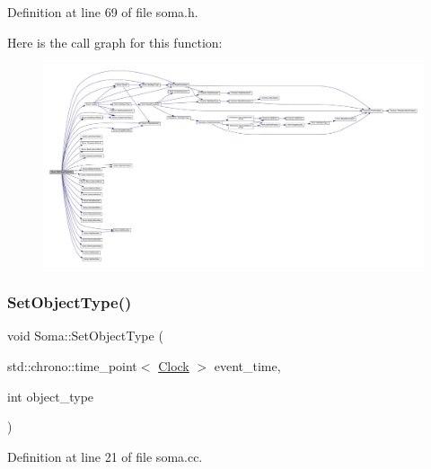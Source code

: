 Definition at line 69 of file soma.\+h.

Here is the call graph for this function\+:
\nopagebreak
\begin{figure}[H]
\begin{center}
\leavevmode
\includegraphics[width=350pt]{class_soma_ae2876b37909f37e8922ce364eb06491f_cgraph}
\end{center}
\end{figure}
\mbox{\label{class_soma_a85b4708eb51ab0962a6128b87aff0700}} 
\subsubsection{\texorpdfstring{Set\+Object\+Type()}{SetObjectType()}}
{\footnotesize\ttfamily void Soma\+::\+Set\+Object\+Type (\begin{DoxyParamCaption}\item[{std\+::chrono\+::time\+\_\+point$<$ \hyperlink{universe_8h_a0ef8d951d1ca5ab3cfaf7ab4c7a6fd80}{Clock} $>$}]{event\+\_\+time,  }\item[{int}]{object\+\_\+type }\end{DoxyParamCaption})}



Definition at line 21 of file soma.\+cc.

